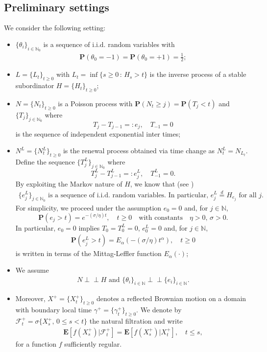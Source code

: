 \documentclass[10pt,a4paper]{article}
\numberwithin{equation}{section}
\newcommand{\indep}{\perp \! \! \! \perp}
\theoremstyle{plain}
\theoremstyle{remark}
\begin{document}
\subsection{Preliminary settings}
We consider the following setting:
\begin{itemize}
\item[-] $\{\theta_i\}_{i \in \mathbb{N}_0}$ is a sequence of i.i.d. random variables with
\begin{align*}
\mathbf{P}(\theta_0 = -1) = \mathbf{P}(\theta_0=+1) = \frac{1}{2};
\end{align*}
\item[-] $L=\{L_t\}_{t\geq 0}$ with $L_t = \inf\{s\geq 0\,:\, H_s >t\}$ is the inverse process of a stable subordinator $H=\{H_t\}_{t\geq 0}$;
\item[-] $N=\{N_t\}_{t \geq 0}$ is a Poisson process with $\mathbf{P}(N_t \geq j) = \mathbf{P}(T_j < t)$ and $\{T_j\}_{j \in \mathbb{N}_0}$ where
$$T_j - T_{j-1} =: e_j, \quad T_{-1}=0$$ 
is the sequence of independent exponential inter times;
\item[-] $N^L = \{N^L_t\}_{t\geq 0}$ is the renewal process obtained via time change as $N^L_t=N_{L_t}$. Define the sequence $\{T^L_j\}_{j \in \mathbb{N}_0}$ where
$$T^L_j - T^L_{j-1} =: e^L_j, \quad T^L_{-1}=0.$$ 
By exploiting the Markov nature of $H$, we know that (see \cite[Theorem 6.8 and Theorem 6.15]{EJP}) 
\begin{align*}
\textrm{$\{e^L_j\}_{j \in \mathbb{N}_0}$ is a sequence of i.i.d. random variables. In particular, $e^L_j \stackrel{d}{=} H_{e_j}$ for all $j$.}
\end{align*}
For simplicity, we proceed under the assumption $e_0=0$ and, for $j \in \mathbb{N}$, 
$$\mathbf{P}(e_j >t) = e^{- (\sigma/\eta) t}, \quad t \geq 0 \quad \textrm{with constants} \quad \eta>0,\, \sigma >0.$$
In particular, $e_0=0$ implies $T_0 = T^L_0=0$, $e^L_0=0$ and, for $j \in \mathbb{N}$,
\begin{align*}
\mathbf{P}(e^L_j > t) = E_\alpha(-(\sigma/\eta) t^\alpha), \quad t \geq 0
\end{align*}
is written in terms of the Mittag-Leffler function $E_\alpha(\cdot)$;
\item[-] We assume
\begin{align}
\textrm{$N \indep H$ and $\{\theta_i\}_{i \in \mathbb{N}} \indep \{e_i\}_{i \in \mathbb{N}}$.}
\label{AllIndep}
\end{align}
\item[-] Moreover, $X^+ =\{X^+_t\}_{t \geq 0}$ denotes a reflected Brownian motion on a domain with boundary local time $\gamma^+=\{\gamma^+_t\}_{t\geq 0}$. We denote by $\mathcal{F}^+_t = \sigma\{X^+_s, \, 0\leq s < t\}$ the natural filtration and write 
\begin{align*}
\mathbf{E}[f(X^+_s)| \mathcal{F}^+_t] = \mathbf{E}[f(X^+_s)|X^+_t], \quad t \leq s,
\end{align*}
for a function $f$ sufficiently regular.
\end{itemize}
\end{document}
